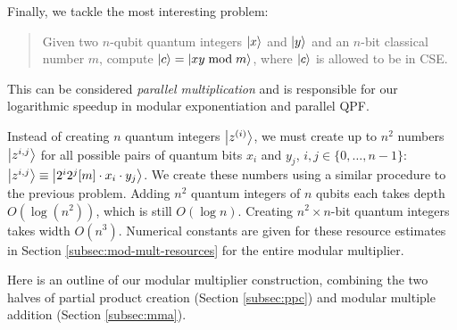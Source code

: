 \documentclass[twoside]{article}
\begin{document}

Finally, we tackle the most interesting problem:
\begin{quote}
Given two $n$-qubit quantum integers $\left\vert{x}\right\rangle$ and
$\left\vert{y}\right\rangle$ and an $n$-bit classical number
$m$,
compute $\left\vert{c}\right\rangle = \left\vert{xy \bmod m}\right\rangle$,
where $\left\vert{c}\right\rangle$ is allowed to be in CSE.
\end{quote}

This can be considered \emph{parallel multiplication} and is responsible
for our logarithmic speedup in modular exponentiation and parallel QPF.


Instead of creating $n$ quantum integers $\left\vert{z^{(i)}}\right\rangle$, we must create
up to $n^2$ numbers
$\left\vert{z^{i,j}}\right\rangle$ for all possible pairs of quantum bits $x_i$ and $y_j$,
$i,j \in \{0,\ldots,n-1\}$:
$\left\vert{z^{i,j}}\right\rangle \equiv \left\vert{2^i2^j[m]\cdot x_i \cdot y_j}\right\rangle$.
We create these numbers using a similar procedure to the previous problem.
Adding $n^2$ quantum integers of $n$ qubits each takes depth
$O(\log(n^2))$, which is still $O(\log n)$.
Creating $n^2\times n$-bit quantum integers takes width $O(n^3)$.
Numerical constants are given for these resource estimates in
Section \ref{subsec:mod-mult-resources} for the entire modular multiplier.

Here is an outline of our modular multiplier construction, combining the
two halves of partial product creation (Section \ref{subsec:ppc}) and
modular multiple addition (Section \ref{subsec:mma}).
\end{document}
